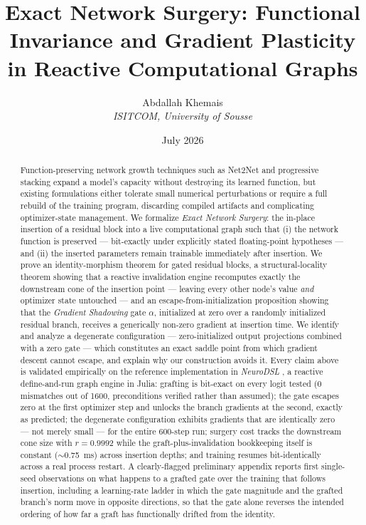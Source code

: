 \documentclass[11pt,a4paper]{article}
\begin{document}
\title{Exact Network Surgery: Functional Invariance and Gradient Plasticity in Reactive Computational Graphs}
\author{Abdallah Khemais \\ \textit{ISITCOM, University of Sousse}}
\date{July 2026}

\maketitle

\begin{abstract}
Function-preserving network growth techniques such as Net2Net \cite{net2net} and progressive stacking \cite{stacking} expand a model's capacity without destroying its learned function, but existing formulations either tolerate small numerical perturbations or require a full rebuild of the training program, discarding compiled artifacts and complicating optimizer-state management. We formalize \emph{Exact Network Surgery}: the in-place insertion of a residual block into a live computational graph such that (i) the network function is preserved --- bit-exactly under explicitly stated floating-point hypotheses --- and (ii) the inserted parameters remain trainable immediately after insertion. We prove an identity-morphism theorem for gated residual blocks, a structural-locality theorem showing that a reactive invalidation engine recomputes exactly the downstream cone of the insertion point --- leaving every other node's value \emph{and} optimizer state untouched --- and an escape-from-initialization proposition showing that the \emph{Gradient Shadowing} gate $\alpha$, initialized at zero over a randomly initialized residual branch, receives a generically non-zero gradient at insertion time. We identify and analyze a degenerate configuration --- zero-initialized output projections combined with a zero gate --- which constitutes an exact saddle point from which gradient descent cannot escape, and explain why our construction avoids it. Every claim above is validated empirically on the reference implementation in \emph{NeuroDSL} \cite{neurodsl}, a reactive define-and-run graph engine in Julia: grafting is bit-exact on every logit tested (0 mismatches out of 1600, preconditions verified rather than assumed); the gate escapes zero at the first optimizer step and unlocks the branch gradients at the second, exactly as predicted; the degenerate configuration exhibits gradients that are identically zero --- not merely small --- for the entire 600-step run; surgery cost tracks the downstream cone size with $r = 0.9992$ while the graft-plus-invalidation bookkeeping itself is constant ($\sim$0.75~ms) across insertion depths; and training resumes bit-identically across a real process restart. A clearly-flagged preliminary appendix reports first single-seed observations on what happens to a grafted gate over the training that follows insertion, including a learning-rate ladder in which the gate magnitude and the grafted branch's norm move in opposite directions, so that the gate alone reverses the intended ordering of how far a graft has functionally drifted from the identity.
\end{abstract}
\end{document}
